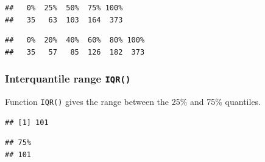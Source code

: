 \documentclass[]{book}
\newenvironment{Shaded}{\begin{snugshade}}{\end{snugshade}}
\newcommand{\CommentTok}[1]{\textcolor[rgb]{0.56,0.35,0.01}{\textit{#1}}}
\newcommand{\DataTypeTok}[1]{\textcolor[rgb]{0.13,0.29,0.53}{#1}}
\newcommand{\DecValTok}[1]{\textcolor[rgb]{0.00,0.00,0.81}{#1}}
\newcommand{\FloatTok}[1]{\textcolor[rgb]{0.00,0.00,0.81}{#1}}
\newcommand{\KeywordTok}[1]{\textcolor[rgb]{0.13,0.29,0.53}{\textbf{#1}}}
\newcommand{\NormalTok}[1]{#1}
\newcommand{\OperatorTok}[1]{\textcolor[rgb]{0.81,0.36,0.00}{\textbf{#1}}}
\newcommand{\StringTok}[1]{\textcolor[rgb]{0.31,0.60,0.02}{#1}}
\begin{document}
\begin{verbatim}
##   0%  25%  50%  75% 100% 
##   35   63  103  164  373
\end{verbatim}

\begin{Shaded}
\end{Shaded}

\begin{verbatim}
##   0%  20%  40%  60%  80% 100% 
##   35   57   85  126  182  373
\end{verbatim}

\hypertarget{interquantile-range-iqr}{%
\subsubsection*{\texorpdfstring{Interquantile range \texttt{IQR()}}{Interquantile range IQR()}}\label{interquantile-range-iqr}}

Function \texttt{IQR()} gives the range between the 25\% and 75\% quantiles.

\begin{Shaded}
\end{Shaded}

\begin{verbatim}
## [1] 101
\end{verbatim}

\begin{Shaded}
\end{Shaded}

\begin{verbatim}
## 75% 
## 101
\end{verbatim}
\end{document}
